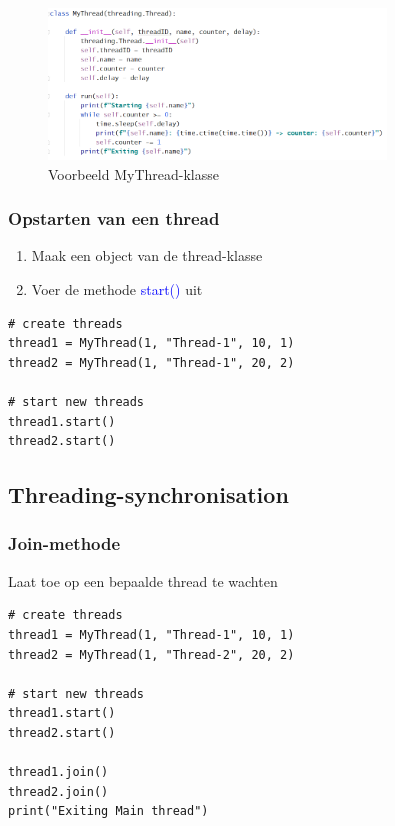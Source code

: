 \documentclass{article}
\begin{document}
\begin{figure}[H]
    \centering
    \includegraphics[width=0.8\textwidth]{thread-class.png}
    \caption{Voorbeeld MyThread-klasse}
\end{figure}

\subsubsection{Opstarten van een thread}

\begin{enumerate}
    \item Maak een object van de thread-klasse
    \item Voer de methode \textcolor{blue}{start()} uit 
\end{enumerate}

\begin{verbatim}
# create threads
thread1 = MyThread(1, "Thread-1", 10, 1)
thread2 = MyThread(1, "Thread-1", 20, 2)

# start new threads
thread1.start()
thread2.start()
\end{verbatim}

\subsection{Threading-synchronisation}

\subsubsection{Join-methode}

Laat toe op een bepaalde thread te wachten

\begin{verbatim}
# create threads
thread1 = MyThread(1, "Thread-1", 10, 1)
thread2 = MyThread(1, "Thread-2", 20, 2)

# start new threads
thread1.start()
thread2.start()

thread1.join()
thread2.join()
print("Exiting Main thread")
\end{verbatim}
\end{document}
